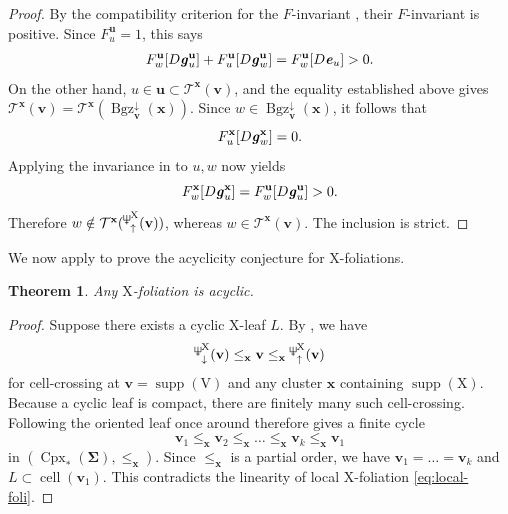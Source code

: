 \documentclass[11pt,reqno]{amsart}
\newcommand{\Neptune}{\mathord{\text{\tikz[baseline=-.5ex,scale=.13]{\draw[line width=.45pt] (0,0)--(0,1.8) (-.6,1.8)--(-.6,.8)--(.6,.8)--(.6,1.8) (-.35,.35)--(.35,.35);}}}}
\theoremstyle{plain}
\newtheorem{theorem}{Theorem}[section]
\theoremstyle{definition}
\newtheorem{definition}[theorem]{Definition}
\numberwithin{equation}{section}
\newcommand\<{\langle}
\renewcommand\>{\rangle}
\newcommand{\on}[1]{\operatorname{#1}}
\def\CCx{\on{Cpx}}   %
\def\cc{\on{cell}}  %
\def\ww{\mathbf{w}}
\def\vv{\mathbf{v}}
\def\uu{\mathbf{u}}
\def\sink{X}
\newcommand{\flowU}[1]{\on{Evo}_{\uparrow}^{#1}}
\newcommand{\ccpt}[1]{\mathrm{#1}}%
\def\xevo{\ccpt{X}}%
\newcommand{\bfit}[1]{\textbf{\textit{#1}}}
\def\seeds{\mathbf{\Sigma}}
\def\xx{\mathbf{x}}%
\def\gvec{\bfit{g}}
\def\Fpoly{{F}}
\def\supp{\on{supp}}
\def\cell{\on{cell}}
\newcommand{\Bgzm}[2]{\operatorname{Bgz}^{\downarrow}_{#2}(#1)}
\newcommand{\suppd}[1]{\operatorname{\Neptune}_{\downarrow}^{#1}}
\newcommand{\suppu}[1]{\operatorname{\Neptune}_{\uparrow}^{#1}}
\newcommand{\ol}[1]{\overline{#1}}
\newcommand{\dom}[1]{\mathcal{T}^{#1}}
\begin{document}
\begin{proof}
By the compatibility criterion for the $F$-invariant
\cite[Thm.~4.19]{Cao}, their $F$-invariant is positive.  Since
$\Fpoly^{\uu}_u=1$, this says
\begin{gather}\label{eq:F3}
\Fpoly^{\uu}_w[D\gvec^{\uu}_u]
+\Fpoly^{\uu}_u[D\gvec^{\uu}_w]
=\Fpoly^{\uu}_w[D\bfit e_u]>0.
\end{gather}
On the other hand, $u\in\uu\subset\dom{\xx}(\vv)$, and the equality established above gives 
$\dom{\xx}(\vv)=\dom{\xx}(\Bgzm{\xx}{\vv})$.  Since
$w\in\Bgzm{\xx}{\vv}$, it follows that
\[
\Fpoly^{\xx}_u[D\gvec^{\xx}_w]=0.
\]
Applying the invariance in  to $u,w$ now yields
\[
\Fpoly^{\xx}_w[D\gvec^{\xx}_u]
=\Fpoly^{\uu}_w[D\gvec^{\uu}_u]>0.
\]
Therefore $w\notin\dom{\xx}(\suppu{\xevo}(\vv))$, whereas
$w\in\dom{\xx}(\vv)$.  The inclusion is strict.
\end{proof}

We now apply  to prove the acyclicity conjecture for $\xevo$-foliations.

\begin{theorem}\label{thm:acyclic}
    Any $\xevo$-foliation is acyclic.
\end{theorem}

\begin{proof}
Suppose there exists a cyclic $\xevo$-leaf $L$.
By , we have
\begin{gather}\label{eq:gXorder}
    \suppd{\xevo}(\vv)\le_{{\xx}}\vv\le_{{\xx}}\suppu{\xevo}(\vv)
\end{gather}
for cell-crossing at $\vv=\supp(\ccpt{V})$ and any cluster ${\xx}$ containing $\supp(\xevo)$.
Because a cyclic leaf is compact, there are  finitely many such cell-crossing.
Following the oriented leaf once around therefore gives a finite cycle
\[
\vv_1\le_{{\xx}}\vv_2\le_{{\xx}}\ldots\le_{{\xx}}\vv_k\le_{{\xx}}\vv_1
\]
in $(\CCx_*(\seeds),\le_{{\xx}})$.
Since $\le_{{\xx}}$ is a partial order, we have $\vv_1=\ldots=\vv_k$ and
$L\subset\cc(\vv_1)$.
This contradicts the linearity of local $\xevo$-foliation \eqref{eq:local-foli}.
\end{proof}


\end{document}

